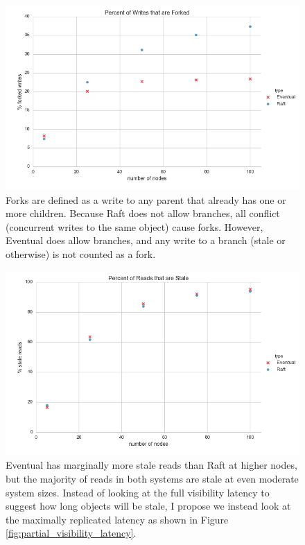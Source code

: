 \documentclass[11pt,letterpaper]{article}
\begin{document}
\begin{figure}[!h]
    \centering
        \includegraphics[width=\textwidth]{hcfigures/forked_writes.png}
        \caption{\textsf{Forks are defined as a write to any parent that already has one or more children. Because Raft does not allow branches, all conflict (concurrent writes to the same object) cause forks. However, Eventual does allow branches, and any write to a branch (stale or otherwise) is not counted as a fork.}}
        \label{fig:forked_writes}
\end{figure}

\begin{figure}[!h]
    \centering
        \includegraphics[width=\textwidth]{hcfigures/stale_reads.png}
        \caption{\textsf{Eventual has marginally more stale reads than Raft at higher nodes, but the majority of reads in both systems are stale at even moderate system sizes. Instead of looking at the full visibility latency to suggest how long objects will be stale, I propose we instead look at the maximally replicated latency as shown in Figure \ref{fig:partial_visibility_latency}.}}
        \label{fig:stale_reads}
\end{figure}
\end{document}
